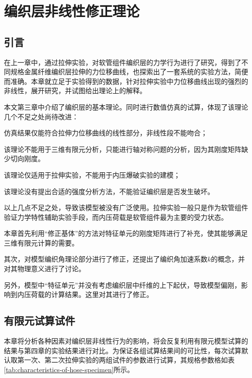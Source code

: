 
\chapter{编织层非线性修正理论}


\section{引言}

在上一章中，通过拉伸实验，对软管组件编织层的力学行为进行了研究，得到了不同规格金属纤维编织层拉伸的力位移曲线，也探索出了一套系统的实验方法，简便而准确。本章就立足于实验得到的数据，针对拉伸实验中力位移曲线出现的强烈的非线性，展开研究，并试图给出理论上的解释。


本文第三章中介绍了\ha 编织层的基本理论。同时进行数值仿真的试算，体现了该理论几个不足之处尚待改进：
\begin{compactitem}
	\item 仿真结果仅能符合拉伸力位移曲线的线性部分，非线性段不能吻合；
	\item 该理论不能用于三维有限元分析，只能进行轴对称问题的分析，因为其刚度矩阵缺少切向刚度。
	\item 该理论仅适用于拉伸实验，不能用于内压爆破实验的建模；
	\item 该理论没有提出合适的强度分析方法，不能验证编织层是否发生破坏。
\end{compactitem}

以上几点不足之处，导致该模型被没有广泛使用。拉伸实验一般只是作为软管组件验证力学特性辅助实验手段，而内压荷载是软管组件最为主要的受力状态。


本章首先利用“修正基体”的方法对特征单元的刚度矩阵进行了补充，使其能够满足三维有限元计算的需要。

其次，对\ha 模型编织角理论部分进行了修正，还提出了编织角加速系数$ k $的概念，并对其物理意义进行了讨论。

另外，\ha 模型中“特征单元”并没有考虑编织层中纤维的上下起伏，导致模型偏刚，影响到内压荷载的计算结果。这里对其进行了修正。

\newpage



\section{有限元试算试件}
本章将分析各种因素对编织层非线性行为的影响，将会反复利用有限元模型试算的结果与第四章的实验结果进行对比。为保证各组试算结果间的可比性，每次试算默认取第一次、第二次拉伸实验的两组试件的参数进行试算，其规格参数格如表\ref{tab:characteristics-of-hose-specimen}所示。



